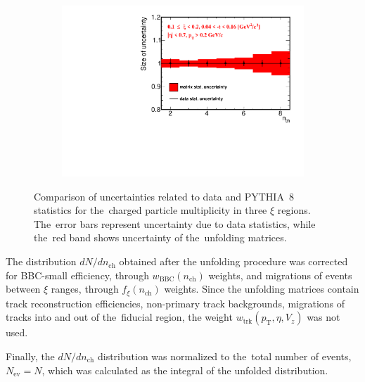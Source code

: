 \begin{figure}[t!]
\begin{subfigure}{.49\textwidth}
		\includegraphics[width=\textwidth,page=1]{chapters/chrgSTAR/img/unfolding/matrix_stat_2.pdf}
	\end{subfigure}
	\hfill
	\begin{minipage}{.48\textwidth}
		\caption{Comparison of  uncertainties  related to data and PYTHIA~8 statistics  for the~charged particle multiplicity in three $\xi$ regions. 
			The~error bars represent uncertainty due to  data
			statistics, while the~red band shows uncertainty of the~unfolding matrices.}
		\label{fig:responseSTAR_uncert}
	\end{minipage}
\end{figure}

The distribution $dN/dn_\textrm{ch}$ obtained after the unfolding procedure
was corrected for BBC-small efficiency, through $w_\textrm{BBC}(n_\textrm{ch})$ weights, and migrations of events between $\xi$ ranges, through $f_{\xi}(n_\textrm{ch})$ weights. Since the unfolding matrices contain track reconstruction efficiencies, non-primary track backgrounds, migrations of tracks into and out of the~fiducial region, the weight $w_\textrm{trk}\left(p_\textrm{T},\eta,V_{z}\right)$ was not used.

Finally, the $dN/dn_\textrm{ch}$ distribution was normalized to the~total number of events, $N_\textrm{ev}=N$, which was calculated as the integral of the unfolded  distribution.



